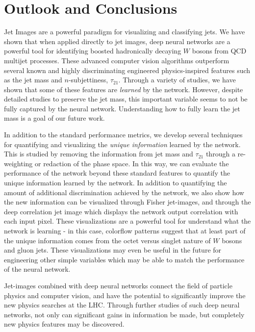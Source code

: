 \section{Outlook and Conclusions}
\label{sec:conclusion}
Jet Images are a powerful paradigm for visualizing and classifying jets.  We have shown that when applied directly to jet images, deep neural networks are a powerful tool for identifying boosted hadronically decaying $W$ bosons from QCD multijet processes.  These advanced computer vision algorithms outperform several known and highly discriminating engineered physics-inspired features such as the jet mass and $n$-subjettiness, $\tau_{21}$.  Through a variety of studies, we have shown that some of these features are {\it learned} by the network.  However, despite detailed studies to preserve the jet mass, this important variable seems to not be fully captured by the neural network.  Understanding how to fully learn the jet mass is a goal of our future work.

In addition to the standard performance metrics, we develop several techniques for quantifying and visualizing the {\it unique information} learned by the network.  This is studied by removing the information from jet mass and $\tau_{21}$ through a re-weighting or redaction of the phase space.  In this way, we can evaluate the performance of the network beyond these standard features to quantify the unique information learned by the network.  In addition to quantifying the amount of additional discrimination achieved by the network, we also show how the new information can be visualized through Fisher jet-images, and through the deep correlation jet image which displays the network output correlation with each input pixel.  These visualizations are a powerful tool for understand what the network is learning - in this case, colorflow patterns suggest that at least part of the unique information comes from the octet versus singlet nature of $W$ bosons and gluon jets.  These visualizations may even be useful in the future for engineering other simple variables which may be able to match the performance of the neural network.

Jet-images combined with deep neural networks connect the field of particle physics and computer vision, and have the potential to significantly improve the new physics searches at the LHC.  Through further studies of such deep neural networks, not only can significant gains in information be made, but completely new physics features may be discovered.